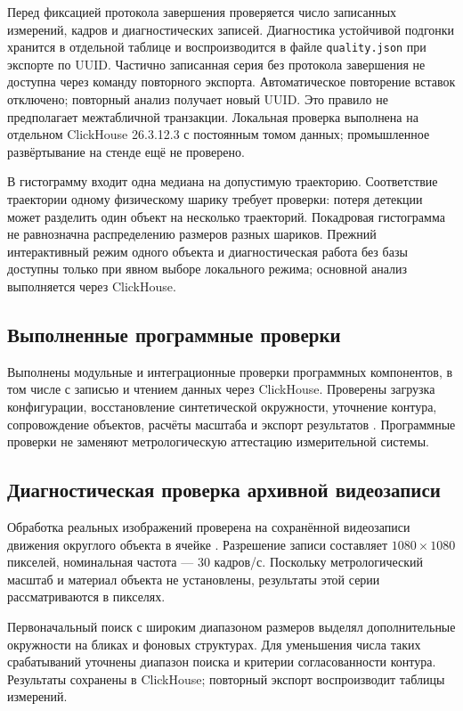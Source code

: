 \documentclass[12pt,a4paper]{article}
\begin{document}
Перед фиксацией протокола завершения проверяется число записанных измерений, кадров и диагностических записей. Диагностика устойчивой подгонки хранится в отдельной таблице и воспроизводится в файле \texttt{quality.json} при экспорте по UUID. Частично записанная серия без протокола завершения не доступна через команду повторного экспорта. Автоматическое повторение вставок отключено; повторный анализ получает новый UUID. Это правило не предполагает межтабличной транзакции. Локальная проверка выполнена на отдельном ClickHouse 26.3.12.3 с постоянным томом данных; промышленное развёртывание на стенде ещё не проверено.

В гистограмму входит одна медиана на допустимую траекторию. Соответствие траектории одному физическому шарику требует проверки: потеря детекции может разделить один объект на несколько траекторий. Покадровая гистограмма не равнозначна распределению размеров разных шариков. Прежний интерактивный режим одного объекта и диагностическая работа без базы доступны только при явном выборе локального режима; основной анализ выполняется через ClickHouse.

\subsection{Выполненные программные проверки}
Выполнены модульные и интеграционные проверки программных компонентов, в том числе с записью и чтением данных через ClickHouse. Проверены загрузка конфигурации, восстановление синтетической окружности, уточнение контура, сопровождение объектов, расчёты масштаба и экспорт результатов \cite{tests}. Программные проверки не заменяют метрологическую аттестацию измерительной системы.

\subsection{Диагностическая проверка архивной видеозаписи}
Обработка реальных изображений проверена на сохранённой видеозаписи движения округлого объекта в ячейке \cite{drivevideo}. Разрешение записи составляет $1080\times1080$ пикселей, номинальная частота --- 30 кадров/с. Поскольку метрологический масштаб и материал объекта не установлены, результаты этой серии рассматриваются в пикселях.

Первоначальный поиск с широким диапазоном размеров выделял дополнительные окружности на бликах и фоновых структурах. Для уменьшения числа таких срабатываний уточнены диапазон поиска и критерии согласованности контура. Результаты сохранены в ClickHouse; повторный экспорт воспроизводит таблицы измерений.
\end{document}
